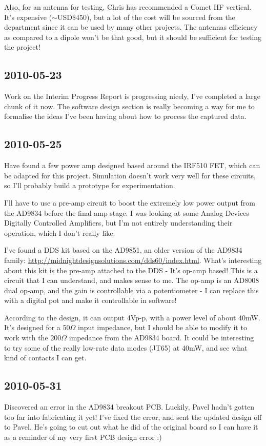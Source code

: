 \documentclass[a4paper,10pt]{article}
\begin{document}
Also, for an antenna for testing, Chris has recommended a Comet HF vertical. It's expensive ($\sim$USD\$450), but a lot of the cost will be sourced from the department since it can be used by many other projects. The antennas efficiency as compared to a dipole won't be that good, but it should be sufficient for testing the project!

\subsection{2010-05-23}
Work on the Interim Progress Report is progressing nicely, I've completed a large chunk of it now. The software design section is really becoming a way for me to formalise the ideas I've been having about how to process the captured data. 

\subsection{2010-05-25}
Have found a few power amp designed based around the IRF510 FET, which can be adapted for this project. Simulation doesn't work very well for these circuits, so I'll probably build a prototype for experimentation. 

I'll have to use a pre-amp circuit to boost the extremely low power output from the AD9834 before the final amp stage. I was looking at some Analog Devices Digitally Controlled Amplifiers, but I'm not entirely understanding their operation, which I don't really like.

I've found a DDS kit based on the AD9851, an older version of the AD9834 family: \url{http://midnightdesignsolutions.com/dds60/index.html}. What's interesting about this kit is the pre-amp attached to the DDS - It's op-amp based! This is a circuit that I can understand, and makes sense to me. The op-amp is an AD8008 dual op-amp, and the gain is controllable via a potentiometer - I can replace this with a digital pot and make it controllable in software!

According to the design, it can output 4Vp-p, with a power level of about 40mW. It's designed for a 50$\Omega$ input impedance, but I should be able to modify it to work with the 200$\Omega$ impedance from the AD9834 board. It could be interesting to try some of the really low-rate data modes (JT65) at 40mW, and see what kind of contacts I can get.

\subsection{2010-05-31}
Discovered an error in the AD9834 breakout PCB. Luckily, Pavel hadn't gotten too far into fabricating it yet! I've fixed the error, and sent the updated design off to Pavel. He's going to cut out what he did of the original board so I can have it as a reminder of my very first PCB design error :)
\end{document}
